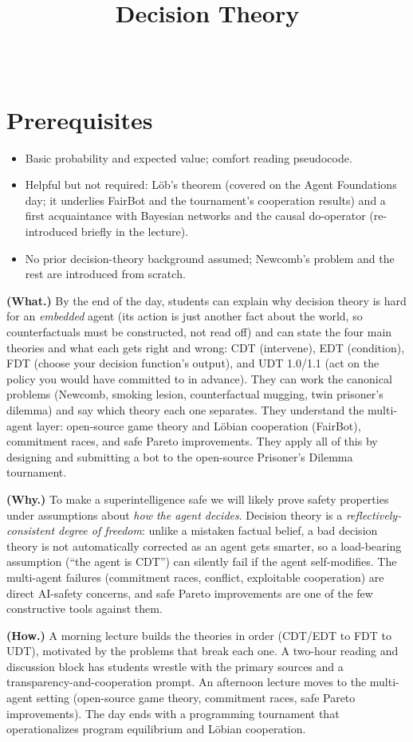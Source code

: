 \documentclass[11pt]{article}
\title{Decision Theory}
\author{
  \authorname{Daniel C}
  \and
  \authorname{Satya Benson}\\
  \affiliation{Williams College}
}
\begin{document}
\maketitle

\section{Prerequisites}
\begin{itemize}
\item
  Basic probability and expected value; comfort reading pseudocode.
\item
  Helpful but not required: Löb's theorem (covered on the Agent Foundations day; it underlies FairBot and the tournament's cooperation results) and a first acquaintance with Bayesian networks and the causal do-operator (re-introduced briefly in the lecture).
\item
  No prior decision-theory background assumed; Newcomb's problem and the rest are introduced from scratch.
\end{itemize}

\begin{learningoutcomes}
\textbf{(What.)} By the end of the day, students can explain why decision theory is hard for an \emph{embedded} agent (its action is just another fact about the world, so counterfactuals must be constructed, not read off) and can state the four main theories and what each gets right and wrong: CDT (intervene), EDT (condition), FDT (choose your decision function's output), and UDT 1.0/1.1 (act on the policy you would have committed to in advance). They can work the canonical problems (Newcomb, smoking lesion, counterfactual mugging, twin prisoner's dilemma) and say which theory each one separates. They understand the multi-agent layer: open-source game theory and Löbian cooperation (FairBot), commitment races, and safe Pareto improvements. They apply all of this by designing and submitting a bot to the open-source Prisoner's Dilemma tournament.

\textbf{(Why.)} To make a superintelligence safe we will likely prove safety properties under assumptions about \emph{how the agent decides}. Decision theory is a \emph{reflectively-consistent degree of freedom}: unlike a mistaken factual belief, a bad decision theory is not automatically corrected as an agent gets smarter, so a load-bearing assumption (``the agent is CDT'') can silently fail if the agent self-modifies. The multi-agent failures (commitment races, conflict, exploitable cooperation) are direct AI-safety concerns, and safe Pareto improvements are one of the few constructive tools against them.

\textbf{(How.)} A morning lecture builds the theories in order (CDT/EDT to FDT to UDT), motivated by the problems that break each one. A two-hour reading and discussion block has students wrestle with the primary sources and a transparency-and-cooperation prompt. An afternoon lecture moves to the multi-agent setting (open-source game theory, commitment races, safe Pareto improvements). The day ends with a programming tournament that operationalizes program equilibrium and Löbian cooperation.
\end{learningoutcomes}
\end{document}
